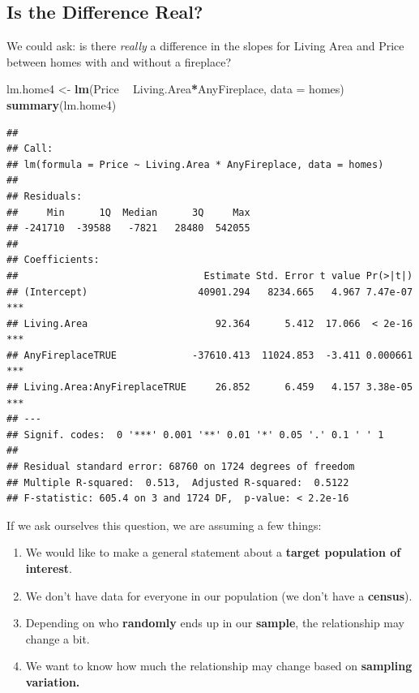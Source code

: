 \documentclass[]{book}
\newenvironment{Shaded}{\begin{snugshade}}{\end{snugshade}}
\newcommand{\DataTypeTok}[1]{\textcolor[rgb]{0.13,0.29,0.53}{#1}}
\newcommand{\KeywordTok}[1]{\textcolor[rgb]{0.13,0.29,0.53}{\textbf{#1}}}
\newcommand{\NormalTok}[1]{#1}
\newcommand{\OperatorTok}[1]{\textcolor[rgb]{0.81,0.36,0.00}{\textbf{#1}}}
\newcommand{\StringTok}[1]{\textcolor[rgb]{0.31,0.60,0.02}{#1}}
\begin{document}
\hypertarget{is-the-difference-real}{%
\subsection{Is the Difference Real?}\label{is-the-difference-real}}

We could ask: is there \emph{really} a difference in the slopes for Living Area and Price between homes with and without a fireplace?

\begin{Shaded}
\begin{Highlighting}[]
\NormalTok{lm.home4 <-}\StringTok{ }\KeywordTok{lm}\NormalTok{(Price }\OperatorTok{~}\StringTok{ }\NormalTok{Living.Area}\OperatorTok{*}\NormalTok{AnyFireplace, }\DataTypeTok{data =}\NormalTok{ homes) }
\KeywordTok{summary}\NormalTok{(lm.home4)}
\end{Highlighting}
\end{Shaded}

\begin{verbatim}
## 
## Call:
## lm(formula = Price ~ Living.Area * AnyFireplace, data = homes)
## 
## Residuals:
##     Min      1Q  Median      3Q     Max 
## -241710  -39588   -7821   28480  542055 
## 
## Coefficients:
##                                Estimate Std. Error t value Pr(>|t|)    
## (Intercept)                   40901.294   8234.665   4.967 7.47e-07 ***
## Living.Area                      92.364      5.412  17.066  < 2e-16 ***
## AnyFireplaceTRUE             -37610.413  11024.853  -3.411 0.000661 ***
## Living.Area:AnyFireplaceTRUE     26.852      6.459   4.157 3.38e-05 ***
## ---
## Signif. codes:  0 '***' 0.001 '**' 0.01 '*' 0.05 '.' 0.1 ' ' 1
## 
## Residual standard error: 68760 on 1724 degrees of freedom
## Multiple R-squared:  0.513,  Adjusted R-squared:  0.5122 
## F-statistic: 605.4 on 3 and 1724 DF,  p-value: < 2.2e-16
\end{verbatim}

If we ask ourselves this question, we are assuming a few things:

\begin{enumerate}
\def\labelenumi{\arabic{enumi}.}
\item
  We would like to make a general statement about a \textbf{target population of interest}.
\item
  We don't have data for everyone in our population (we don't have a \textbf{census}).
\item
  Depending on who \textbf{randomly} ends up in our \textbf{sample}, the relationship may change a bit.
\item
  We want to know how much the relationship may change based on \textbf{sampling variation.}
\end{enumerate}
\end{document}
